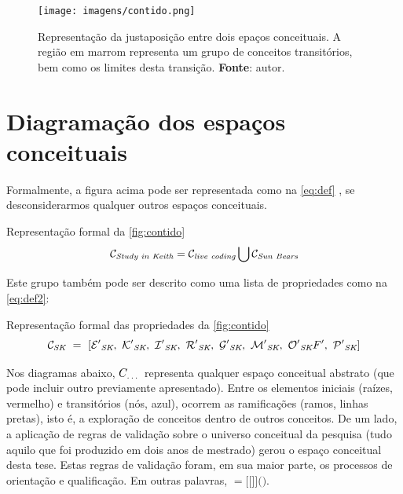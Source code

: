 \begin{figure}[!h]
  \centering
  \texttt{[image: imagens/contido.png]}
  \caption{Representação da justaposição  entre dois epaços conceituais. A região em marrom representa um grupo de conceitos transitórios, bem como os limites desta transição. \textbf{Fonte}: autor. }
  \label{fig:contido}
\end{figure}

\section{Diagramação dos espaços conceituais}\label{sec:diagrama}

\newcommand{\csfeq}[2]{
\mathcal{#1}_\emph{#2}
}

\newcommand{\unionspaces}[6]{
\csfeq{#1}{#2} = \csfeq{#3}{#4} \bigcup \csfeq{#5}{#6}
}

\newcommand{\listspaces}[9]{
\csfeq{#1}{#2}~=~[\csfeq{#3}{#2},~\csfeq{#4}{#2},~\csfeq{#5}{#2},~\csfeq{#6}{#2},~\csfeq{#7}{#2},~\csfeq{#8}{#2},~\csfeq{#9}{#2}
}

Formalmente, a figura acima pode ser representada como na \autoref{eq:def} , se desconsiderarmos qualquer outros espaços conceituais.

\begin{example}{Representação formal da \autoref{fig:contido}}
\begin{equation}
\unionspaces{C}{Study in Keith}{C}{live coding}{C}{Sun Bears}
\label{eq:def}
\end{equation}
\end{example}

Este grupo também pode ser descrito como uma lista de propriedades como na \autoref{eq:def2}:

\begin{example}{Representação formal das propriedades da \autoref{fig:contido}}
\begin{equation}
\listspaces{C}{SK}{E'}{K'}{I'}{R'}{G'}{M'}{O'}{F'},~\csfeq{P'}{SK}]
\label{eq:def2}
\end{equation}
\end{example}
  
Nos diagramas abaixo, $C_\emph{\ldots}$ representa qualquer espaço conceitual abstrato (que pode incluir outro previamente apresentado). Entre os elementos iniciais (raízes, vermelho) e transitórios (nós, azul), ocorrem as ramificações (ramos, linhas pretas), isto é, a exploração de conceitos dentro de outros conceitos. De um lado, a aplicação de regras de validação sobre o universo conceitual da pesquisa (tudo aquilo que foi produzido em dois anos de mestrado) gerou o espaço conceitual desta tese. Estas regras de validação foram, em sua maior parte, os processos de orientação e qualificação. Em outras palavras, $=[[$$]]($$)$.

